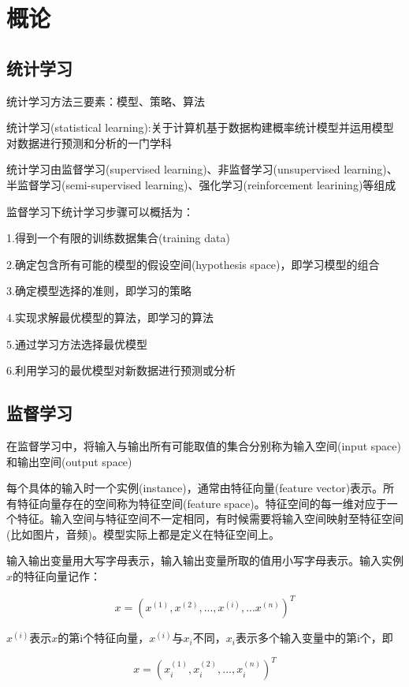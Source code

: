 \documentclass{ctexart}
\begin{document}
	\section{概论}
	
	\subsection{统计学习}
	
	统计学习方法三要素：模型、策略、算法
	
	统计学习(statistical learning):关于计算机基于数据构建概率统计模型并运用模型对数据进行预测和分析的一门学科
	
	统计学习由监督学习(supervised learning)、非监督学习(unsupervised learning)、半监督学习(semi-supervised learning)、强化学习(reinforcement learining)等组成
	
	监督学习下统计学习步骤可以概括为：
	
	1.得到一个有限的训练数据集合(training data)
	
	2.确定包含所有可能的模型的假设空间(hypothesis space)，即学习模型的组合
	
	3.确定模型选择的准则，即学习的策略
	
	4.实现求解最优模型的算法，即学习的算法
	
	5.通过学习方法选择最优模型
	
	6.利用学习的最优模型对新数据进行预测或分析

	\subsection{监督学习}
	
	在监督学习中，将输入与输出所有可能取值的集合分别称为输入空间(input space)和输出空间(output space)
	
	每个具体的输入时一个实例(instance)，通常由特征向量(feature vector)表示。所有特征向量存在的空间称为特征空间(feature space)。特征空间的每一维对应于一个特征。输入空间与特征空间不一定相同，有时候需要将输入空间映射至特征空间(比如图片，音频)。{\color{red}模型实际上都是定义在特征空间上。}
	
	输入输出变量用大写字母表示，输入输出变量所取的值用小写字母表示。输入实例\(x\)的特征向量记作：
	
	\[x=(x^{(1)}, x^{(2)}, ..., x^{(i)}, ... x^{(n)})^T\]
	
	\(x^{(i)}\)表示\(x\)的第i个特征向量，\(x^{(i)}\)与\(x_i\)不同，\(x_i\)表示多个输入变量中的第i个，即
	
	\[x=(x^{(1)}_i, x^{(2)}_i, ..., x^{(n)}_i)^T\]
	
\end{document}
